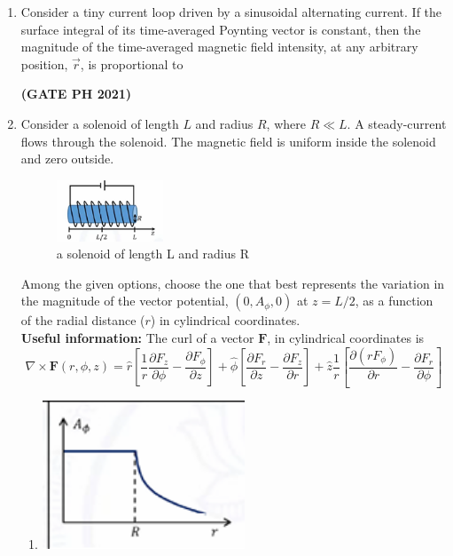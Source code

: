 \documentclass[14pt, a4paper]{extarticle}
\renewcommand{\vec}[1]{\overrightarrow{#1}}
\begin{document}
\begin{enumerate}[label=\textbf{Q.\arabic*}]
\begin{enumerate}[label=\textbf{Q.\arabic*}]
\item Consider a tiny current loop driven by a sinusoidal alternating current. If the surface integral of its time-averaged Poynting vector is constant, then the magnitude of the time-averaged magnetic field intensity, at any arbitrary position, $\vec{r}$, is proportional to
\begin{enumerate}
\end{enumerate}
\hfill \textbf{(GATE PH 2021)}


\item Consider a solenoid of length $L$ and radius $R$, where $R \ll L$. A steady-current flows through the solenoid. The magnetic field is uniform inside the solenoid and zero outside.
\begin{figure}[H]
\centering
\includegraphics[width=0.3\textwidth]{figs/q16fig21.png}
\caption{a solenoid of length L and radius R}
\end{figure}
Among the given options, choose the one that best represents the variation in the magnitude of the vector potential, $(0, A_\phi, 0)$ at $z = L/2$, as a function of the radial distance ($r$) in cylindrical coordinates. \\
\textbf{Useful information:} The curl of a vector $\mathbf{F}$, in cylindrical coordinates is
$$ \nabla \times \mathbf{F}(r, \phi, z) = \hat{r}\left[\frac{1}{r}\frac{\partial F_z}{\partial \phi} - \frac{\partial F_\phi}{\partial z}\right] + \hat{\phi}\left[\frac{\partial F_r}{\partial z} - \frac{\partial F_z}{\partial r}\right] + \hat{z}\frac{1}{r}\left[\frac{\partial (rF_\phi)}{\partial r} - \frac{\partial F_r}{\partial \phi}\right] $$
\begin{enumerate}
\item \includegraphics[width=0.5\textwidth]{figs/q16figa21.png}

\end{enumerate}
\end{enumerate}
\end{enumerate}
\end{document}
